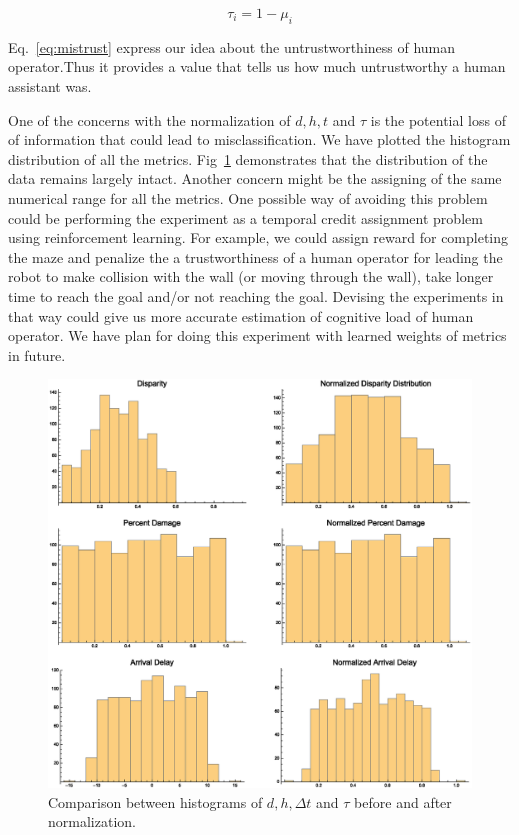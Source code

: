 \documentclass{sig-alternate}
\begin{document}
  \begin{equation}
  \label{eq:trust}
  \tau_i= 1 - \mu_i
  \end{equation}

Eq.~\ref{eq:mistrust} express our idea about the untrustworthiness of human operator.Thus it provides a value that tells us how much
untrustworthy a human assistant was.

One of the concerns with the normalization of $d, h, t$ and
$\tau $ is the potential loss of of information that could lead to
misclassification. We have plotted the histogram distribution of all
the metrics.  Fig~\ref{fig:hist_norm} demonstrates that the
distribution of the data remains largely intact. Another concern might be the assigning of the same numerical range for all the metrics. One possible way of avoiding this problem could be performing the experiment as a temporal credit assignment problem using reinforcement learning. For example, we could assign reward for completing the maze and penalize the a trustworthiness of a human operator for leading the robot to make collision with the wall (or moving through the wall), take longer time to reach the goal and/or not reaching the goal. Devising the experiments in that way could give us more accurate estimation of cognitive load of human operator. We have plan for doing this experiment with learned weights of metrics in future.  

\begin{figure}
\centering
\includegraphics[width=.5\textwidth]{histograms.eps} 
\caption{Comparison between histograms of $d, h, \Delta t$ and $\tau$
  before and after normalization.}
\label{fig:hist_norm}
\end{figure}
 
\end{document}
